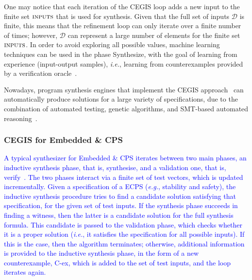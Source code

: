 \documentclass{cta-author}
\begin{document}
One may notice that each iteration of the CEGIS loop adds a new input to the finite set $\text{\sc inputs}$ that is used for synthesis.  Given that the full set of inputs $\mathcal{D}$ is finite, this means that the refinement loop can only iterate over a finite number of times; however, $\mathcal{D}$ can represent a large number of elements for the finite set $\text{\sc inputs}$. In order to avoid exploring all possible values, machine learning techniques can be used in the phase {\sc Synthesize}, with the goal of learning from experience (input-output samples), {\it i.e.}, learning from counterexamples provided by a verification oracle~\cite{Alur13}.

Nowadays, program synthesis engines that implement the CEGIS approach~\cite{sketch} can automatically produce solutions for a large variety of specifications, due to the combination of automated testing, genetic algorithms, and SMT-based automated reasoning~\cite{Sharma14}.


\subsubsection{CEGIS for Embedded \& CPS}
\label{sec:CEGISforECPS}

\textcolor{blue}{A typical synthesizer for Embedded \& CPS iterates between two main phases, 
	an inductive synthesis phase, that is, {\sc synthesise}, and a validation one, that is, {\sc verify}~\cite{AbateBCCCDKKP17}.  
	The two phases interact via a finite set of test vectors, which is updated
	incrementally.  Given a specification of a ECPS ({\it e.g.}, stability and safety), the inductive
	synthesis procedure tries to find a candidate solution satisfying that
	specification, for the given set of test inputs.}
%
\textcolor{blue}{If the synthesis phase succeeds in finding a witness, then the latter is a
	candidate solution for the full synthesis formula. This candidate is passed to the validation phase, which checks whether it is a proper solution
	({\it i.e.}, it satisfies the specification for all possible inputs).  If this is the
	case, then the algorithm terminates; otherwise, additional information is
	provided to the inductive synthesis phase, in the form of a new
	counterexample, C-ex, which is added to the set of test inputs, and the loop
	iterates again.}
\end{document}
